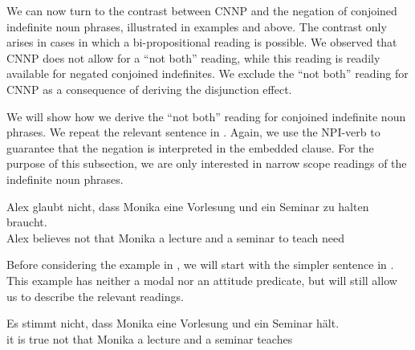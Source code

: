 \documentclass[output=paper]{langsci/langscibook}
\begin{document}
We can now turn to the contrast between CNNP and the negation of conjoined indefinite noun phrases, illustrated in examples  and  above. 
The contrast only arises in cases in which a bi-propositional reading is possible. 
We observed that CNNP does not allow for a ``not both'' reading, while this reading is readily available for negated conjoined indefinites. 
We exclude the ``not both'' reading for CNNP as a consequence of deriving the disjunction effect. 

We will show how we derive the ``not both'' reading for conjoined indefinite noun phrases. 
We repeat the relevant sentence in . 
Again, we use the NPI-verb  to guarantee that the negation is interpreted in the embedded clause.
For the purpose of this subsection, we are only interested in narrow scope readings of the indefinite noun phrases.





\ea \label{ex-glaub-notEX2}
\gll Alex glaubt nicht, dass Monika eine Vorlesung und ein Seminar zu halten braucht.\\
Alex believes not that Monika a lecture and a seminar to teach need\\
\glt {}
\z 

Before considering the example in , we will start with the simpler sentence in . This example has neither a modal nor an attitude predicate, but will still allow us to describe the relevant readings.

\ea \label{notEX}
\gll Es stimmt nicht, dass Monika eine Vorlesung und ein Seminar hält.\\
it {is true} not that Monika a lecture and a seminar teaches\\
\glt {}
\z 
\end{document}
